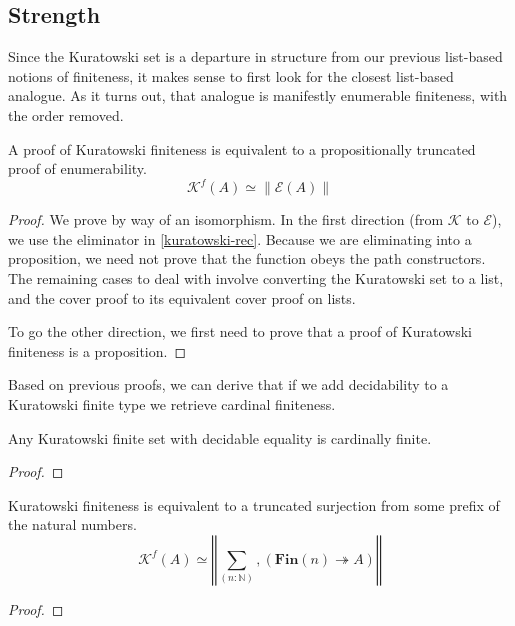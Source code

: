 \subsection{Strength}
Since the Kuratowski set is a departure in structure from our previous
list-based notions of finiteness, it makes sense to first look for the closest
list-based analogue.
As it turns out, that analogue is manifestly enumerable finiteness, with the
order removed.
\begin{theorem}
  A proof of Kuratowski finiteness is equivalent to a propositionally truncated
  proof of enumerability.
  \begin{equation}
    \mathcal{K}^f(A) \simeq \lVert \mathcal{E}(A) \rVert
  \end{equation}
\end{theorem}
\begin{proof}
  We prove by way of an isomorphism.
  In the first direction (from \(\mathcal{K}\) to \(\mathcal{E}\)), we use the
  eliminator in \ref{kuratowski-rec}.
  Because we are eliminating into a proposition, we need not prove that the
  function obeys the path constructors.
  The remaining cases to deal with involve converting the Kuratowski set to a
  list, and the cover proof to its equivalent cover proof on lists.

  To go the other direction, we first need to prove that a proof of Kuratowski
  finiteness is a proposition.
\end{proof}
Based on previous proofs, we can derive that if we add decidability to a
Kuratowski finite type we retrieve cardinal finiteness.
\begin{lemma}
  Any Kuratowski finite set with decidable equality is cardinally finite.
\end{lemma}
\begin{proof}
\end{proof}
\begin{lemma}
  Kuratowski finiteness is equivalent to a truncated surjection from some prefix
  of the natural numbers.
  \begin{equation}
    \mathcal{K}^f(A) \simeq \left\Vert \sum_{(n : \mathbb{N})} , \left(  \mathbf{Fin}(n) \twoheadrightarrow A \right) \right\Vert
  \end{equation}
\end{lemma}
\begin{proof}
\end{proof}
